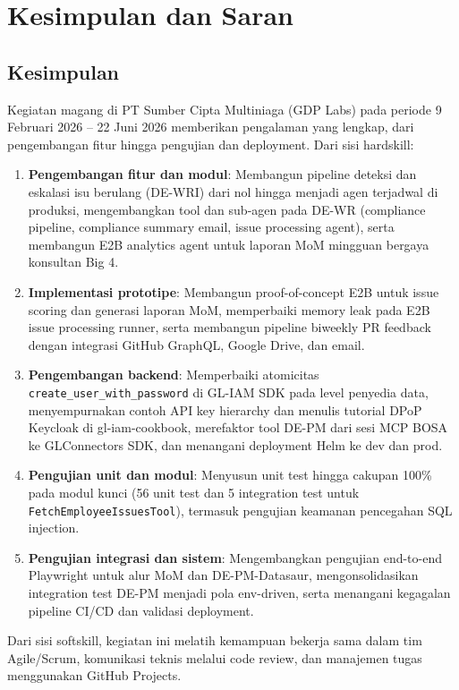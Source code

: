 \section{Kesimpulan dan Saran}

\subsection{Kesimpulan}

Kegiatan magang di PT Sumber Cipta Multiniaga (GDP Labs) pada periode 9 Februari 2026 -- 22 Juni 2026 memberikan pengalaman yang lengkap, dari pengembangan fitur hingga pengujian dan deployment. Dari sisi hardskill:

\begin{enumerate}
    \item \textbf{Pengembangan fitur dan modul}: Membangun pipeline deteksi dan eskalasi isu berulang (DE-WRI) dari nol hingga menjadi agen terjadwal di produksi, mengembangkan tool dan sub-agen pada DE-WR (compliance pipeline, compliance summary email, issue processing agent), serta membangun E2B analytics agent untuk laporan MoM mingguan bergaya konsultan Big 4.
    \item \textbf{Implementasi prototipe}: Membangun proof-of-concept E2B untuk issue scoring dan generasi laporan MoM, memperbaiki memory leak pada E2B issue processing runner, serta membangun pipeline biweekly PR feedback dengan integrasi GitHub GraphQL, Google Drive, dan email.
    \item \textbf{Pengembangan backend}: Memperbaiki atomicitas \texttt{create\_user\_with\_password} di GL-IAM SDK pada level penyedia data, menyempurnakan contoh API key hierarchy dan menulis tutorial DPoP Keycloak di gl-iam-cookbook, merefaktor tool DE-PM dari sesi MCP BOSA ke GLConnectors SDK, dan menangani deployment Helm ke dev dan prod.
    \item \textbf{Pengujian unit dan modul}: Menyusun unit test hingga cakupan 100\% pada modul kunci (56 unit test dan 5 integration test untuk \texttt{FetchEmployeeIssuesTool}), termasuk pengujian keamanan pencegahan SQL injection.
    \item \textbf{Pengujian integrasi dan sistem}: Mengembangkan pengujian end-to-end Playwright untuk alur MoM dan DE-PM-Datasaur, mengonsolidasikan integration test DE-PM menjadi pola env-driven, serta menangani kegagalan pipeline CI/CD dan validasi deployment.
\end{enumerate}

Dari sisi softskill, kegiatan ini melatih kemampuan bekerja sama dalam tim Agile/Scrum, komunikasi teknis melalui code review, dan manajemen tugas menggunakan GitHub Projects.

